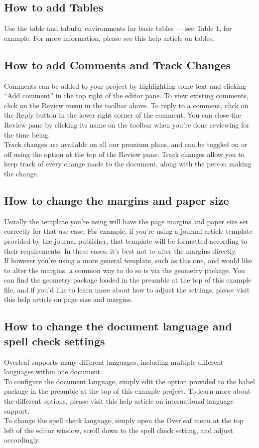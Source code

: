 \documentclass{article}
\begin{document}
	\subsection{ How to add Tables}
	Use the table and tabular environments for basic tables — see Table 1, for example. For more information, please see this help article on tables.
	
	\subsection{ How to add Comments and Track Changes}
	Comments can be added to your project by highlighting some text and clicking “Add comment” in
	the top right of the editor pane. To view existing comments, click on the Review menu in the toolbar above. To reply to a comment, click on the Reply button in the lower right corner of the comment. You can close the Review pane by clicking its name on the toolbar when you’re done reviewing for the time being.\\
	\indent Track changes are available on all our premium plans, and can be toggled on or off using the option at the top of the Review pane. Track changes allow you to keep track of every change made to the document, along with the person making the change.
	
	\subsection{ How to change the margins and paper size}
	Usually the template you’re using will have the page margins and paper size set correctly for that use-case. For example, if you’re using a journal article template provided by the journal publisher, that template will be formatted according to their requirements. In these cases, it’s best not to alter the margins directly.\\
	\indent If however you’re using a more general template, such as this one, and would like to alter the margins, a common way to do so is via the geometry package. You can find the geometry package loaded in the preamble at the top of this example file, and if you’d like to learn more about how to adjust the settings, please visit this help article on page size and margins.
	
	\subsection{How to change the document language and spell check settings}
	Overleaf supports many different languages, including multiple different languages within one document.\\
	\indent To configure the document language, simply edit the option provided to the babel package in the preamble at the top of this example project. To learn more about the different options, please visit this help article on international language support.\\
	\indent To change the spell check language, simply open the Overleaf menu at the top left of the editor window, scroll down to the spell check setting, and adjust accordingly.
	
\end{document}
